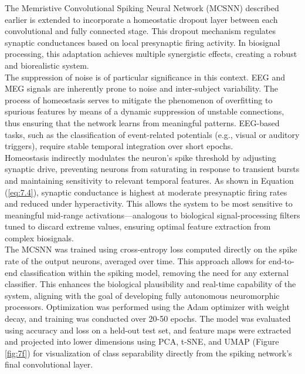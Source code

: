 The Memristive Convolutional Spiking Neural Network (MCSNN) described earlier is extended to incorporate a homeostatic dropout layer between each convolutional and fully connected stage. This dropout mechanism regulates synaptic conductances based on local presynaptic firing activity. In biosignal processing, this adaptation achieves multiple synergistic effects, creating a robust and biorealistic system.\\

\noindent The suppression of noise is of particular significance in this context. EEG and MEG signals are inherently prone to noise and inter-subject variability. The process of homeostasis serves to mitigate the phenomenon of overfitting to spurious features by means of a dynamic suppression of unstable connections, thus ensuring that the network learns from meaningful patterns. EEG-based tasks, such as the classification of event-related potentials (e.g., visual or auditory triggers), require stable temporal integration over short epochs. \\

\noindent Homeostasis indirectly modulates the neuron's spike threshold by adjusting synaptic drive, preventing neurons from saturating in response to transient bursts and maintaining sensitivity to relevant temporal features. As shown in Equation (\ref{eq:7.4}), synaptic conductance is highest at moderate presynaptic firing rates and reduced under hyperactivity. This allows the system to be most sensitive to meaningful mid-range activations—analogous to biological signal-processing filters tuned to discard extreme values, ensuring optimal feature extraction from complex biosignals.\\

\noindent The MCSNN was trained using cross-entropy loss computed directly on the spike rate of the output neurons, averaged over time. This approach allows for end-to-end classification within the spiking model, removing the need for any external classifier. This enhances the biological plausibility and real-time capability of the system, aligning with the goal of developing fully autonomous neuromorphic processors. Optimization was performed using the Adam optimizer with weight decay, and training was conducted over 20-50 epochs. The model was evaluated using accuracy and loss on a held-out test set, and feature maps were extracted and projected into lower dimensions using PCA, t-SNE, and UMAP (Figure \ref{fig:7f}) for visualization of class separability directly from the spiking network's final convolutional layer.\\

